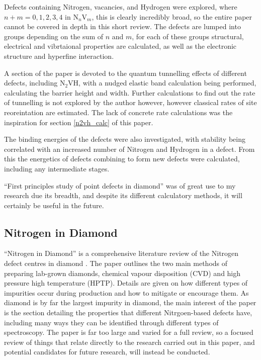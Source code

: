 \documentclass[10pt,a4paper,twocolumn,twoside]{extarticle}
\newcommand{\ntvh}{N$_2$VH}
\begin{document}
Defects containing Nitrogen, vacancies, and Hydrogen were explored, where $n +m = 0, 1, 2, 3, 4$ in N$_n$V$_m$, this is clearly incredibly broad, so the entire paper cannot be covered in depth in this short review. The defects are lumped into groups depending on the sum of $n$ and $m$, for each of these groups structural, electrical and vibrtaional properties are calculated, as well as the electronic structure and hyperfine interaction.

A section of the paper is devoted to the quantum tunnelling effects of different defects, including {\ntvh}, with a nudged elastic band calculation being performed, calculating the barrier height and width. Further calculations to find out the rate of tunnelling is not explored by the author however, however classical rates of site reoreintation are estimated. The lack of concrete rate calculations was the inspiration for section \ref{n2vh_calc} of this paper.

The binding energies of the defects were also investigated, with stability being correlated with an increased number of Nitrogen and Hydrogen in a defect. From this the energetics of defects combining to form new defects were calculated, including any intermediate stages. 

``First principles study of point defects in diamond'' was of great use to my research due its breadth, and despite its different calculatory methods, it will certainly be useful in the future. 

\subsection{Nitrogen in Diamond}
``Nitrogen in Diamond'' is a comprehensive literature review of the Nitrogen defect centres in diamond \cite{NitrogeninDiamond}. 
The paper outlines the two main methods of preparing lab-grown diamonds, chemical vapour disposition (CVD) and high pressure high temperature (HPTP). Details are given on how different types of impurities occur during production and how to mitigate or encourage them. As diamond is by far the largest impurity in diamond, the main interest of the paper is the section detailing the properties that different Nitrgoen-based defects have, including many ways they can be identified through different types of spectroscopy. The paper is far too large and varied for a full review, so a focused review of things that relate directly to the research carried out in this paper, and potential candidates for future research, will instead be conducted. 
\end{document}
